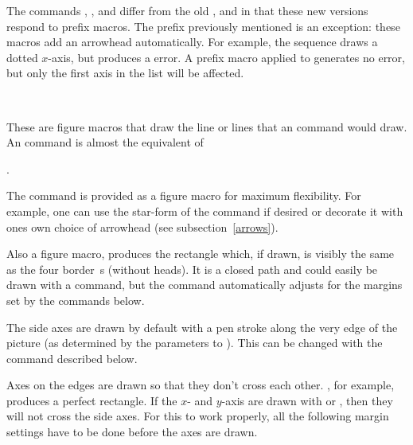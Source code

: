 \documentclass[letterpaper]{article}
\begin{document}
The commands , , and
 differ from the old ,  and
 in that these new versions respond to prefix macros. The
 prefix previously mentioned is an exception: these macros add
an arrowhead automatically. For example, the sequence
 draws a dotted $x$-axis, but
 produces a \MF{} error. A prefix macro applied to
 generates no error, but only the first axis in the list will
be affected.

\begin{cd}
\\
%
%
%
\end{cd}

These are figure macros that draw the line or lines that an 
command would draw. An  command is almost the equivalent of
\begin{display}
.
\end{display}
The  command is provided as a figure macro for maximum
flexibility. For example, one can use the star-form of the 
command if desired or decorate it with ones own choice of arrowhead (see
subsection~\ref{arrows}).

Also a figure macro,  produces the rectangle which, if drawn,
is visibly the same as the four border \,s (without heads).
It is a closed path and could easily be drawn with a  command,
but the  command automatically adjusts for the margins set by
the commands below.

The side axes are drawn by default with a pen stroke along the very edge
of the picture (as determined by the parameters to ). This can
be changed with the command  described below.

Axes on the edges are drawn so that they don't cross each other.
, for example, produces a perfect rectangle. If the
$x$- and $y$-axis are drawn with  or , then they
will not cross the side axes. For this to work properly, all the
following margin settings have to be done before the axes are drawn.

\begin{cd}
\\
%
  \\
%
%
%
%
\end{cd}
\end{document}
